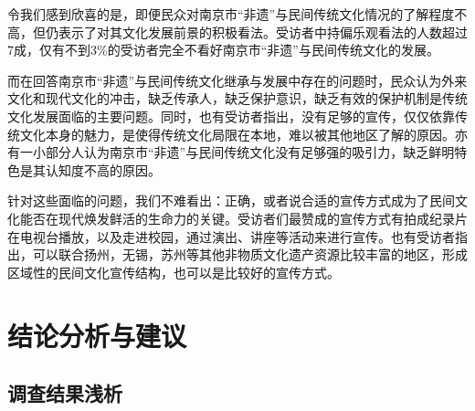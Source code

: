 \documentclass[12pt]{article}%
\begin{document}
令我们感到欣喜的是，即便民众对南京市“非遗”与民间传统文化情况的了解程度不高，但仍表示了对其文化发展前景的积极看法。受访者中持偏乐观看法的人数超过7成，仅有不到3\%的受访者完全不看好南京市“非遗”与民间传统文化的发展。

而在回答南京市“非遗”与民间传统文化继承与发展中存在的问题时，民众认为外来文化和现代文化的冲击，缺乏传承人，缺乏保护意识，缺乏有效的保护机制是传统文化发展面临的主要问题。同时，也有受访者指出，没有足够的宣传，仅仅依靠传统文化本身的魅力，是使得传统文化局限在本地，难以被其他地区了解的原因。亦有一小部分人认为南京市“非遗”与民间传统文化没有足够强的吸引力，缺乏鲜明特色是其认知度不高的原因。

针对这些面临的问题，我们不难看出：正确，或者说合适的宣传方式成为了民间文化能否在现代焕发鲜活的生命力的关键。受访者们最赞成的宣传方式有拍成纪录片在电视台播放，以及走进校园，通过演出、讲座等活动来进行宣传。也有受访者指出，可以联合扬州，无锡，苏州等其他非物质文化遗产资源比较丰富的地区，形成区域性的民间文化宣传结构，也可以是比较好的宣传方式。

\section{结论分析与建议}

\subsection{调查结果浅析}
\end{document}
